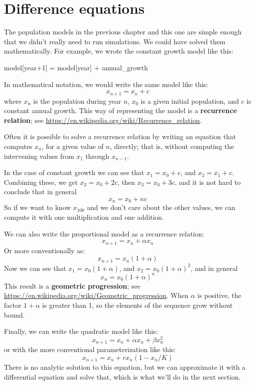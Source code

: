 \documentclass[12pt]{book}
\theoremstyle{exercise}
\begin{document}
\section{Difference equations}

The population models in the previous chapter and this one are simple enough that we didn't really need to run simulations.  We could have solved them mathematically.  For example, we wrote the constant growth model like this:

\begin{python}
model[year+1] = model[year] + annual_growth
\end{python}

In mathematical notation, we would write the same model like this:
%
\[ x_{n+1} = x_n + c \]
%
where $x_n$ is the population during year $n$, $x_0$ is a given initial population, and $c$ is constant annual growth.  This way of representing the model is a {\bf recurrence relation}; see \url{https://en.wikipedia.org/wiki/Recurrence_relation}.

Often it is possible to solve a recurrence relation by writing an equation that computes $x_n$, for a given value of $n$, directly; that is, without computing the intervening values from $x_1$ through $x_{n-1}$.

In the case of constant growth we can see that $x_1 = x_0 + c$, and $x_2 = x_1 + c$.  Combining these, we get $x_2 = x_0 + 2c$, then $x_3 = x_0 + 3c$, and it is not hard to conclude that in general
%
\[ x_n = x_0 + nc \]
%
So if we want to know $x_100$ and we don't care about the other values, we can compute it with one multiplication and one addition.

We can also write the proportional model as a recurrence relation:
%
\[ x_{n+1} = x_n + \alpha x_n \]
%
Or more conventionally as:
%
\[ x_{n+1} = x_n (1 + \alpha) \]
%
Now we can see that $x_1 = x_0 (1 + \alpha)$, and $x_2 = x_0 (1 + \alpha)^2$, and in general
%
\[ x_n = x_0 (1 + \alpha)^n \]
%
This result is a {\bf geometric progression}; see \url{https://en.wikipedia.org/wiki/Geometric_progression}.  When $\alpha$ is positive, the factor $1+\alpha$ is greater than 1, so the elements of the sequence grow without bound.

Finally, we can write the quadratic model like this:
%
\[ x_{n+1} = x_n + \alpha x_n + \beta x_n^2 \]
%
or with the more conventional parameterization like this:
%
\[ x_{n+1} = x_n + r x_n (1 - x_n / K) \]
%
There is no analytic solution to this equation, but we can approximate it with a differential equation and solve that, which is what we'll do in the next section.
\end{document}
